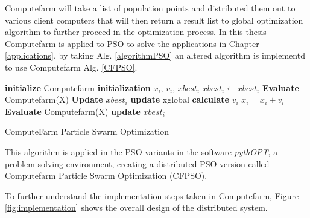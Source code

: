 Computefarm will take a list of population points and distributed them out to various client computers that will then return a result list to global optimization algorithm to further proceed in the optimization process. In this thesis Computefarm is applied to PSO to solve the applications in Chapter \ref{applications}, by taking Alg. \ref{algorithmPSO} an altered algorithm is implementd to use Computefarm Alg. \ref{CFPSO}.

\begin{algorithm}[H]
  \begin{algorithmic}[2]

      \State \textbf{initialize} Computefarm 
        \State \textbf{initialization} $x_i$, $v_i$, $xbest_i$ 
        $xbest_i \gets xbest_i$
    \EndFor
    \State \textbf{Evaluate} Computefarm(X) 
        \State \textbf{Update} $xbest_i$ 
    \EndFor
            \State \textbf{update} xglobal 
            \State \textbf{calculate} $v_i$ 
            \State $x_i = x_i + v_i$
        \EndFor
        \State \textbf{Evaluate} Computefarm(X)
            \State \textbf{update} $xbest_i$
        \EndFor
    \EndWhile
  \end{algorithmic}
\caption{ComputeFarm Particle Swarm Optimization}
\label{CFPSO}
\end{algorithm}
 
This algorithm is applied in the PSO variants in the software \textit{pythOPT}, a problem solving environment, creating a distributed PSO version called Computefarm Particle Swarm Optimization (CFPSO).

To further understand the implementation steps taken in Computefarm, Figure \ref{fig:implementation} shows the overall design of the distributed system. 

